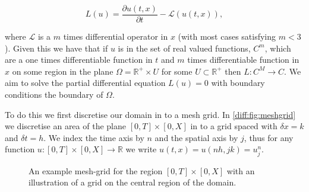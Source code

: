 \documentclass[../main.tex]{subfiles}
\begin{document}
  \begin{equation} \label{diff:eq:pdeprob}
    L(u) = \frac{\partial u(t, x)}{\partial t} - \mathcal{L}(u(t, x)),
  \end{equation}

  where $\mathcal{L}$ is a $m$ times differential operator in $x$ (with most cases satisfying $m < 3$). Given this we have that if $u$ is in the set of real valued functions, $C^m$, which are a one times differentiable function in $t$ and $m$ times differentiable function in $x$ on some region in the plane $\Omega = \mathbb{R}^+ \times U$ for some $U \subset \mathbb{R}^+$ then $L : C^M \to C$. We aim to solve the partial differential equation $L(u) = 0$ with boundary conditions the boundary of $\Omega$.

  To do this we first discretise our domain in to a mesh grid. In \autoref{diff:fig:meshgrid} we discretise an area of the plane $[0, T] \times [0, X]$ in to a grid spaced with $\delta x = k$ and $\delta t = h$. We index the time axis by $n$ and the spatial axis by $j$, thus for any function $u : [0, T] \times [0, X] \to \mathbb{R}$ we write $u(t, x) = u(n h, j k) = u^n_j$.

  \begin{figure}[hbt]
    \centering

    \caption{An example mesh-grid for the region $[0, T] \times [0, X]$ with an illustration of a grid on the central region of the domain. \label{diff:fig:meshgrid}}
  \end{figure}
\end{document}
